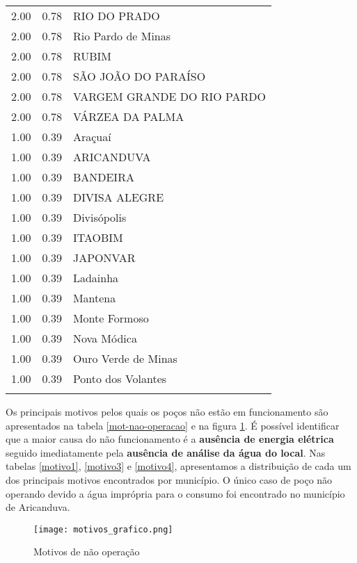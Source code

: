 \documentclass[a4paper, 12pt, openright, oneside, english, brazil, article]{abntex2}
\begin{document}
\begin{scriptsize}
\begin{longtable}{rrl}
		2.00 & 0.78 & RIO DO PRADO \\ 
		2.00 & 0.78 & Rio Pardo de Minas \\ 
		2.00 & 0.78 & RUBIM \\ 
		2.00 & 0.78 & SÃO JOÃO DO PARAÍSO \\ 
		2.00 & 0.78 & VARGEM GRANDE DO RIO PARDO \\ 
		2.00 & 0.78 & VÁRZEA DA PALMA \\ 
		1.00 & 0.39 & Araçuaí \\ 
		1.00 & 0.39 & ARICANDUVA \\ 
		1.00 & 0.39 & BANDEIRA \\ 
		1.00 & 0.39 & DIVISA ALEGRE \\ 
		1.00 & 0.39 & Divisópolis \\ 
		1.00 & 0.39 & ITAOBIM \\ 
		1.00 & 0.39 & JAPONVAR \\ 
		1.00 & 0.39 & Ladainha \\ 
		1.00 & 0.39 & Mantena \\ 
		1.00 & 0.39 & Monte Formoso \\ 
		1.00 & 0.39 & Nova Módica \\ 
		1.00 & 0.39 & Ouro Verde de Minas \\ 
		1.00 & 0.39 & Ponto dos Volantes \\ 
		\hline
		\hline
		\label{poc-operacao}
	\end{longtable}
	\end{scriptsize}
	
	Os principais motivos pelos quais os poços não estão em funcionamento são apresentados na tabela \ref{mot-nao-operacao} e na figura \ref{motivos-grafico}. É possível identificar que a maior causa do não funcionamento é a \textbf{ausência de energia elétrica} seguido imediatamente pela \textbf{ausência de análise da água do local}. Nas tabelas \ref{motivo1}, \ref{motivo3} e \ref{motivo4}, apresentamos a distribuição de cada um dos principais motivos encontrados por município. O único caso de poço não operando devido a água imprópria para o consumo foi encontrado no município de Aricanduva.
	
	
	
	\begin{figure}[!h]
		\centering
		\caption{Motivos de não operação}
		\label{motivos-grafico}
		\texttt{[image: motivos\_grafico.png]}
	\end{figure}
	
\end{document}
